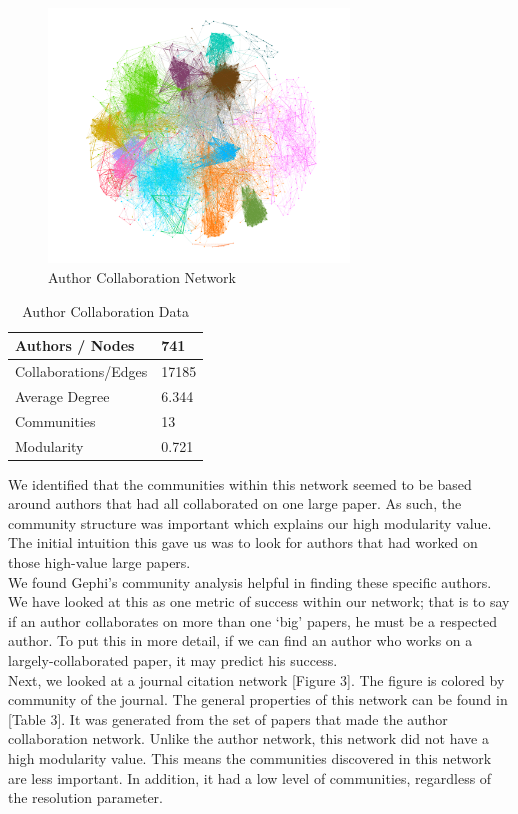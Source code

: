 \documentclass[times, 10pt,twocolumn]{article}
\begin{document}
\begin{figure}[h]
   \includegraphics[width=8cm]{figure2.png}
   \caption{Author Collaboration Network}
\end{figure}

\begin{table}[h]
\centering
\caption{Author Collaboration Data}
\label{my-label}
\begin{tabular}{|l|l|}
\hline
Authors / Nodes      & 741   \\ \hline
Collaborations/Edges & 17185 \\ \hline
Average Degree       & 6.344 \\ \hline
Communities          & 13    \\ \hline
Modularity           & 0.721 \\ \hline
\end{tabular}
\end{table}

We identified that the communities within this network seemed to be based around authors that had all collaborated on one large paper. As such, the community structure was important which explains our high modularity value. The initial intuition this gave us was to look for authors that had worked on those high-value large papers. \\

We found Gephi’s community analysis helpful in finding these specific authors. We have looked at this as one metric of success within our network; that is to say if an author collaborates on more than one ‘big’ papers, he must be a respected author. To put this in more detail, if we can find an author who works on a largely-collaborated paper, it may predict his success.\\

Next, we looked at a journal citation network [Figure 3]. The figure is colored by community of the journal. The general properties of this network can be found in [Table 3]. It was generated from the set of papers that made the author collaboration network. Unlike the author network, this network did not have a high modularity value. This means the communities discovered in this network are less important. In addition, it had a low level of communities, regardless of the resolution parameter. \\
\end{document}
